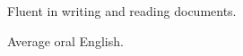\begin{cventries}
  \cventry
    {}
    {}
    {}
    {}
    {
      \begin{cvitems}
        \item {Fluent in writing and reading documents.}
        \item {Average oral English.}
      \end{cvitems}
    }
\end{cventries}

